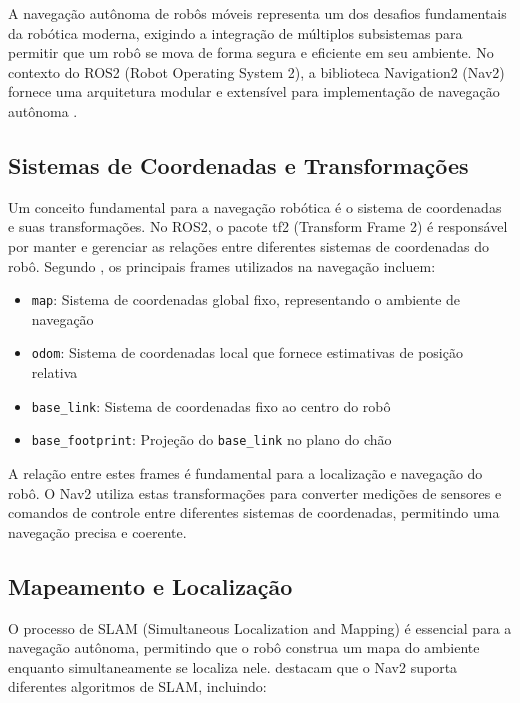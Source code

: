 A navegação autônoma de robôs móveis representa um dos desafios fundamentais da
robótica moderna, exigindo a integração de múltiplos subsistemas para permitir
que um robô se mova de forma segura e eficiente em seu ambiente. No contexto do
ROS2 (Robot Operating System 2), a biblioteca Navigation2 (Nav2) fornece uma
arquitetura modular e extensível para implementação de navegação autônoma
\cite{OKelly2020F1TENTH}.

\subsection{Sistemas de Coordenadas e Transformações}

Um conceito fundamental para a navegação robótica é o sistema de coordenadas e
suas transformações. No ROS2, o pacote tf2 (Transform Frame 2) é responsável
por manter e gerenciar as relações entre diferentes sistemas de coordenadas do
robô. Segundo \cite{Babu2020Simulator}, os principais frames utilizados na
navegação incluem:

\begin{itemize}
    \item \texttt{map}: Sistema de coordenadas global fixo, representando o ambiente de navegação
    \item \texttt{odom}: Sistema de coordenadas local que fornece estimativas de posição relativa
    \item \texttt{base\_link}: Sistema de coordenadas fixo ao centro do robô
    \item \texttt{base\_footprint}: Projeção do \texttt{base\_link} no plano do chão
\end{itemize}

A relação entre estes frames é fundamental para a localização e navegação do
robô. O Nav2 utiliza estas transformações para converter medições de sensores e
comandos de controle entre diferentes sistemas de coordenadas, permitindo uma
navegação precisa e coerente.

\subsection{Mapeamento e Localização}

O processo de SLAM (Simultaneous Localization and Mapping) é essencial para a
navegação autônoma, permitindo que o robô construa um mapa do ambiente enquanto
simultaneamente se localiza nele. \cite{Wang2020LMPC} destacam que o Nav2
suporta diferentes algoritmos de SLAM, incluindo:

